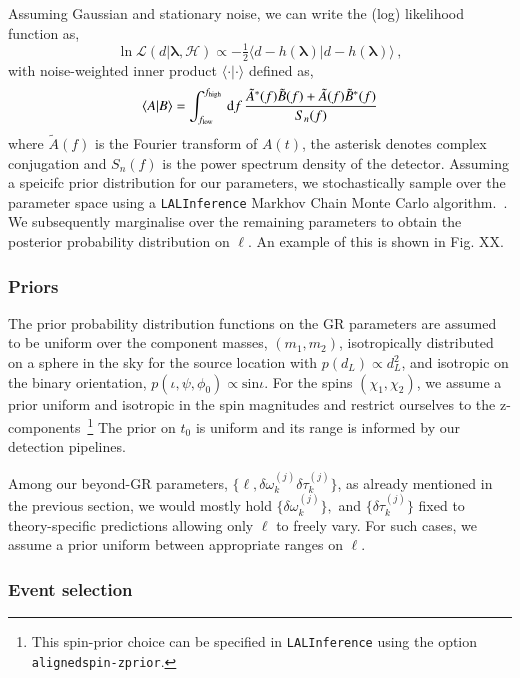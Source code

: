 \documentclass[twocolumn,prd,aps,superscriptaddress,preprintnumbers,tightenlines,showpacs,nofootinbib,eqsecnum,amsfonts,amsmath,longbibliography]{revtex4-1}
\newcommand{\dd}{{\rm d}}
\begin{document}
Assuming Gaussian and stationary noise, we can write the (log) likelihood function as,
%
\begin{equation}
\ln \mathcal{L}(d \vert \bm{\lambda},\mathcal{H}) \propto
- \tfrac{1}{2}
\langle
d - h(\bm{\lambda}) \vert d - h(\bm{\lambda})
\rangle\,,
\end{equation}
%
with noise-weighted inner product $\langle \cdot | \cdot \rangle$ defined as,
%
\begin{equation}
\langle A | B \rangle =
\int_{f_{\rm low}}^{f_{\rm high}} \, \dd f \,
\frac{\tilde{A}^{\ast}(f) \tilde{B}(f) + \tilde{A}(f) \tilde{B}^{\ast}(f)}{S_{n}(f)}
\end{equation}
%
where $\tilde{A}(f)$ is the Fourier transform of $A(t)$, the asterisk
denotes complex conjugation and $S_{n}(f)$ is the power spectrum density
of the detector. Assuming a speicifc prior distribution for our parameters, 
we stochastically sample over the parameter space 
using a \texttt{LALInference} Markhov Chain Monte Carlo 
algorithm.~\cite{lallsuite}. We subsequently marginalise over the 
remaining parameters to obtain the posterior probability distribution on $\ell$. 
An example of this is shown in Fig. XX.

\subsubsection{Priors}

The prior probability distribution functions on the GR parameters are assumed to be uniform over the component masses, $(m_1, m_2)$, isotropically distributed on a sphere in the sky for the source location with $p(d_L) \propto d_L^2$, and isotropic on the binary orientation, $p(\iota, \psi, \phi_0) \propto \text{sin} \iota$. For the spins $(\chi_1, \chi_2)$, we assume a prior uniform and isotropic in the spin magnitudes and restrict ourselves to the z-components~\footnote{This spin-prior choice can be specified in \texttt{LALInference} using the option \texttt{alignedspin-zprior}.} The prior on $t_0$ is uniform and its range is informed by our detection pipelines.

Among our beyond-GR parameters, $\{\ell, \delta \omega_k^{(j)}\delta \tau_k^{(j)}\}$, as already mentioned in the previous section, we would mostly hold $\{\delta \omega_k^{(j)}\},$ and $\{\delta \tau_k^{(j)}\}$ fixed to theory-specific predictions allowing only $\ell$ to freely vary. For such cases, we assume a prior uniform between appropriate ranges on $\ell$.


\subsubsection{Event selection}
\end{document}
